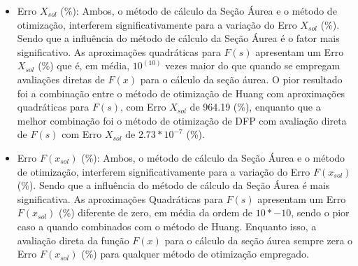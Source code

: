 \begin{itemize}
\begin{itemize}
\begin{itemize}
        \item {Erro $X_{sol}$ (\%):} Ambos, o método de cálculo da Seção Áurea e o método de otimização, interferem significativamente para a variação do Erro $X_{sol}$ (\%). Sendo que a influência do método de cálculo da Seção Áurea é o fator mais significativo. As aproximações quadráticas para $F(s)$ apresentam um Erro $X_{sol}$ (\%) que é, em média, $10^(10)$ vezes maior do que quando se empregam avaliações diretas de $F(x)$ para o cálculo da seção áurea. O pior resultado foi a combinação entre o método de otimização de Huang com aproximações quadráticas para $F(s)$, com Erro $X_{sol}$ de 964.19 (\%), enquanto que a melhor combinação foi o método de otimização de DFP com avaliação direta de $F(s)$ com Erro $X_{sol}$ de $2.73*10^{-7}$ (\%).  
        \item {Erro $F(x_{sol})$ (\%):} Ambos, o método de cálculo da Seção Áurea e o método de otimização, interferem significativamente para a variação do Erro $F(x_{sol})$ (\%). Sendo que a influência do método de cálculo da Seção Áurea é mais significativa. As aproximações Quadráticas para $F(s)$ apresentam um Erro $F(x_{sol})$ (\%) diferente de zero, em média da ordem de $10*{-10}$, sendo o pior caso a quando combinados com o método de Huang. Enquanto isso, a avaliação direta da função $F(x)$ para o cálculo da seção áurea sempre zera o Erro $F(x_{sol})$ (\%) para qualquer método de otimização empregado.
    \end{itemize}
    \end{itemize}
\end{itemize}


